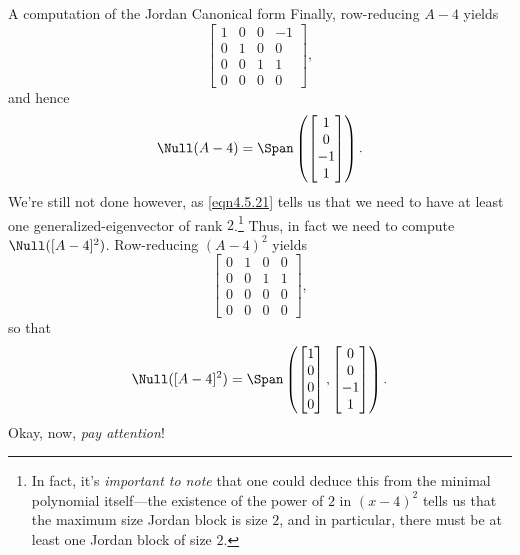 \begin{exm}{A computation of the Jordan Canonical form}{}
	Finally, row-reducing $A-4$ yields
	\begin{equation}
		\begin{bmatrix}1 & 0 & 0 & -1 \\ 0 & 1 & 0 & 0 \\ 0 & 0 & 1 & 1 \\ 0 & 0 & 0 & 0\end{bmatrix},
	\end{equation}
	and hence
	\begin{equation}\label{eqn4.5.27}
		\Null (A-4)=\Span \left( \begin{bmatrix}1 \\ 0 \\ -1 \\ 1\end{bmatrix}\right) .
	\end{equation}
	We're still not done however, as \eqref{eqn4.5.21} tells us that we need to have at least one generalized-eigenvector of rank $2$.\footnote{In fact, it's \emph{important to note} that one could deduce this from the minimal polynomial itself---the existence of the power of $2$ in $(x-4)^2$ tells us that the maximum size Jordan block is size $2$, and in particular, there must be at least one Jordan block of size $2$.}  Thus, in fact we need to compute $\Null ([A-4]^2)$.  Row-reducing $(A-4)^2$ yields
	\begin{equation}
		\begin{bmatrix}0 & 1 & 0 & 0 \\ 0 & 0 & 1 & 1 \\ 0 & 0 & 0 & 0 \\ 0 & 0 & 0 & 0\end{bmatrix},
	\end{equation}
	so that
	\begin{equation}\label{eqn4.5.29}
		\Null ([A-4]^2)=\Span \left( \begin{bmatrix}1 \\ 0 \\ 0 \\ 0\end{bmatrix},\begin{bmatrix}0 \\ 0 \\ -1 \\ 1\end{bmatrix}\right) .
	\end{equation}
	Okay, now, \emph{pay attention}!
	

\end{exm}
